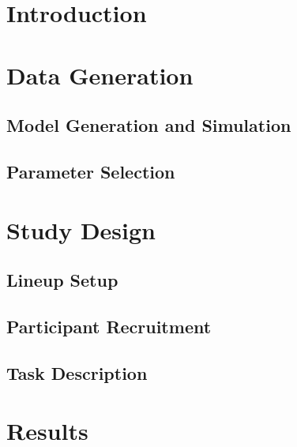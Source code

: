 \documentclass[]{interact}
\theoremstyle{plain}%
\theoremstyle{definition}
\theoremstyle{remark}
\begin{document}
\hypertarget{introduction}{%
\section{Introduction}\label{introduction}}

\citep{buja_statistical_2009, vanderplas_clusters_2017}

\hypertarget{data-generation}{%
\section{Data Generation}\label{data-generation}}

\hypertarget{model-generation-and-simulation}{%
\subsection{Model Generation and
Simulation}\label{model-generation-and-simulation}}

\hypertarget{parameter-selection}{%
\subsection{Parameter Selection}\label{parameter-selection}}

\hypertarget{study-design}{%
\section{Study Design}\label{study-design}}

\hypertarget{lineup-setup}{%
\subsection{Lineup Setup}\label{lineup-setup}}

\hypertarget{participant-recruitment}{%
\subsection{Participant Recruitment}\label{participant-recruitment}}

\hypertarget{task-description}{%
\subsection{Task Description}\label{task-description}}

\hypertarget{results}{%
\section{Results}\label{results}}
\end{document}
